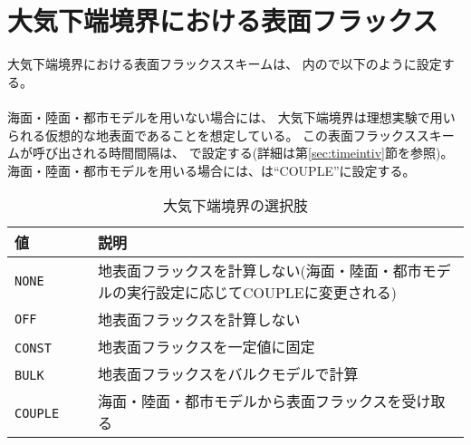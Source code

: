\section{大気下端境界における表面フラックス}
\label{sec:basic_usel_surface}
大気下端境界における表面フラックススキームは、
内ので以下のように設定する。\\

\\

海面・陸面・都市モデルを用いない場合には、
大気下端境界は理想実験で用いられる仮想的な地表面であることを想定している。
この表面フラックススキームが呼び出される時間間隔は、
で設定する(詳細は第\ref{sec:timeintiv}節を参照)。
海面・陸面・都市モデルを用いる場合には、は``COUPLE''に設定する。


\begin{table}[h]
\begin{center}
  \caption{大気下端境界の選択肢}
  \label{tab:nml_atm_sf}
  \begin{tabularx}{150mm}{lX} \hline
    \rowcolor[gray]{0.9}  値 & 説明\\ \hline
      \verb|NONE|         & 地表面フラックスを計算しない(海面・陸面・都市モデルの実行設定に応じてCOUPLEに変更される) \\
      \verb|OFF|          & 地表面フラックスを計算しない \\
      \verb|CONST|   　　　& 地表面フラックスを一定値に固定 \\
      \verb|BULK|    　　　& 地表面フラックスをバルクモデルで計算 \\
      \verb|COUPLE|  　　　& 海面・陸面・都市モデルから表面フラックスを受け取る \\
    \hline
  \end{tabularx}
\end{center}
\end{table}

